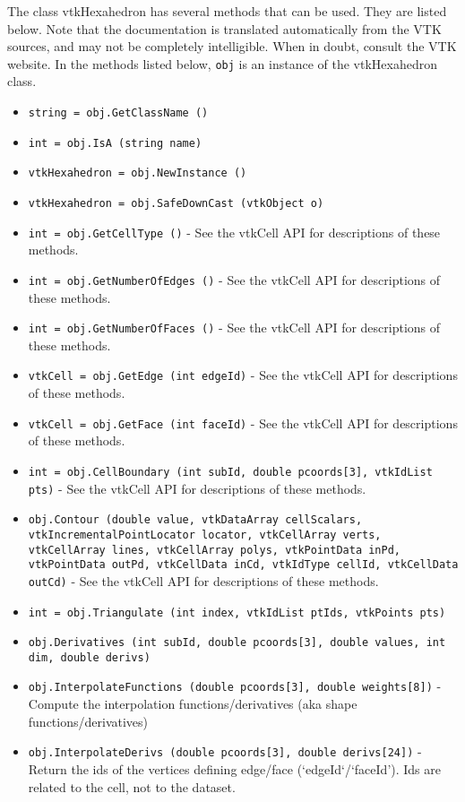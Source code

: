 The class vtkHexahedron has several methods that can be used.
  They are listed below.
Note that the documentation is translated automatically from the VTK sources,
and may not be completely intelligible.  When in doubt, consult the VTK website.
In the methods listed below, \verb|obj| is an instance of the vtkHexahedron class.
\begin{itemize}
\item  \verb|string = obj.GetClassName ()|

\item  \verb|int = obj.IsA (string name)|

\item  \verb|vtkHexahedron = obj.NewInstance ()|

\item  \verb|vtkHexahedron = obj.SafeDownCast (vtkObject o)|

\item  \verb|int = obj.GetCellType ()| -  See the vtkCell API for descriptions of these methods.

\item  \verb|int = obj.GetNumberOfEdges ()| -  See the vtkCell API for descriptions of these methods.

\item  \verb|int = obj.GetNumberOfFaces ()| -  See the vtkCell API for descriptions of these methods.

\item  \verb|vtkCell = obj.GetEdge (int edgeId)| -  See the vtkCell API for descriptions of these methods.

\item  \verb|vtkCell = obj.GetFace (int faceId)| -  See the vtkCell API for descriptions of these methods.

\item  \verb|int = obj.CellBoundary (int subId, double pcoords[3], vtkIdList pts)| -  See the vtkCell API for descriptions of these methods.

\item  \verb|obj.Contour (double value, vtkDataArray cellScalars, vtkIncrementalPointLocator locator, vtkCellArray verts, vtkCellArray lines, vtkCellArray polys, vtkPointData inPd, vtkPointData outPd, vtkCellData inCd, vtkIdType cellId, vtkCellData outCd)| -  See the vtkCell API for descriptions of these methods.

\item  \verb|int = obj.Triangulate (int index, vtkIdList ptIds, vtkPoints pts)|

\item  \verb|obj.Derivatives (int subId, double pcoords[3], double values, int dim, double derivs)|

\item  \verb|obj.InterpolateFunctions (double pcoords[3], double weights[8])| -  Compute the interpolation functions/derivatives
 (aka shape functions/derivatives)

\item  \verb|obj.InterpolateDerivs (double pcoords[3], double derivs[24])| -  Return the ids of the vertices defining edge/face (`edgeId`/`faceId').
 Ids are related to the cell, not to the dataset.

\end{itemize}

